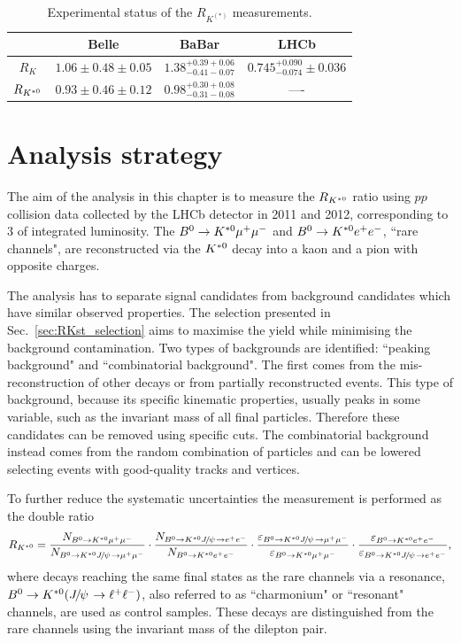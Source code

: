 \begin{center}
\begin{table}[h!]
\centering
\caption{Experimental status of the $R_{K^{(*)}}$ measurements. } %
\begin{tabular}{c|c|c|c}
 	& Belle 			& BaBar 		& LHCb \\
 \hline
$R_K$			& $1.06 \pm 0.48 \pm 0.05$	& $1.38^{+0.39+0.06}_{-0.41-0.07}$ & $0.745^{+0.090}_{-0.074} \pm 0.036$\\
$R_{{{K}^{*0}}}$	& $0.93 \pm 0.46 \pm 0.12$	& $0.98^{+0.30+0.08}_{-0.31-0.08}$ & ----\\
\end{tabular}
\label{tab:expstatus}
\end{table}
\end{center}


\section{Analysis strategy}

The aim of the analysis in this chapter is to measure the $R_{{{K}^{*0}}}$ ratio using $pp$ collision data
collected by the LHCb detector in 2011 and 2012, corresponding to 3 \invfb of integrated luminosity.
The ${{B}^0} \rightarrow {\ensuremath{{K}^{*0}}}{\ensuremath{\mu^+\mu^-}}$ and ${{B}^0} \rightarrow {\ensuremath{{K}^{*0}}}{\ensuremath{e^+e^-}}$, ``rare channels", are
reconstructed via the ${{K}^{*0}}$ decay into a kaon and a pion with opposite charges.

The analysis has to separate signal candidates from background candidates which have similar observed properties. 
The selection presented in Sec.~\ref{sec:RKst_selection} aims to maximise the yield while minimising
the background contamination. Two types of backgrounds are identified: ``peaking background" and ``combinatorial background". 
The first comes from the mis-reconstruction of other decays or from partially reconstructed events. This type 
of background,  because its specific kinematic properties, usually peaks in some variable, such as the invariant
mass of all final particles. Therefore these candidates can be removed using specific cuts. 
The combinatorial background  instead comes from the random combination of particles and can 
be lowered selecting events with good-quality tracks and vertices.

To further reduce the systematic uncertainties the measurement is performed as the double ratio 
%
\begin{equation}
\label{eq:RKst}
R_{\Kstarz} = 
\frac{N_{\Bz\to\Kstarz \mumu}}{N_{\Bz\to\Kstarz\jpsi\to \mumu}} 
\cdot \frac{N_{\Bz\to\Kstarz \jpsi \to \ee}}{N_{\Bz\to\Kstarz\ee}}
\cdot \frac{\varepsilon_{\Bz\to\Kstarz \jpsi \to \mumu}}{\varepsilon_{\Bz\to\Kstarz \mumu}} 
\cdot \frac{\varepsilon_{\Bz\to\Kstarz \ee}}{\varepsilon_{\Bz\to\Kstarz\jpsi\to \ee}},
\end{equation}
%
where decays reaching the same final states as the rare channels via a \jpsi resonance, $\Bz\to\Kstarz(\jpsi\to\ll)$,
also referred to as ``charmonium" or ``resonant" channels, are used as control samples.
These decays are distinguished from the rare channels using the invariant mass of the dilepton pair.

